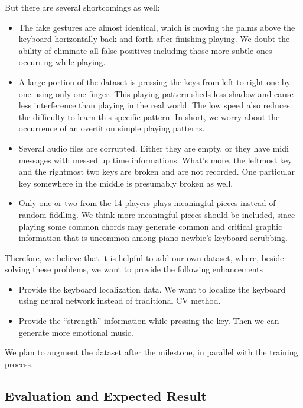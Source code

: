 \documentclass[10pt,twocolumn,letterpaper]{article}
\begin{document}
    But there are several shortcomings as well:
    \begin{itemize}
        \item The fake gestures are almost identical, which is moving the palms above the keyboard horizontally back and forth after finishing playing. We doubt the ability of eliminate all false positives including those more subtle ones occurring while playing.
        \item A large portion of the dataset is pressing the keys from left to right one by one using only one finger. This playing pattern sheds less shadow and cause less interference than playing in the real world. The low speed also reduces the difficulty to learn this specific pattern. In short, we worry about the occurrence of an overfit on simple playing patterns.
        \item Several audio files are corrupted. Either they are empty, or they have midi messages with messed up time informations. What’s more, the leftmost key and the rightmost two keys are broken and are not recorded. One particular key somewhere in the middle is presumably broken as well.
        \item Only one or two from the 14 players plays meaningful pieces instead of random fiddling. We think more meaningful pieces should be included, since playing some common chords may generate common and critical graphic information that is uncommon among piano newbie’s keyboard-scrubbing.
    \end{itemize}

    Therefore, we believe that it is helpful to add our own dataset, where, beside solving these problems, we want to provide the following enhancements
    \begin{itemize}
        \item Provide the keyboard localization data. We want to localize the keyboard using neural network instead of traditional CV method.
        \item Provide the “strength” information while pressing the key. Then we can generate more emotional music.
    \end{itemize}

    We plan to augment the dataset after the milestone, in parallel with the training process.

    \subsection{Evaluation and Expected Result}
\end{document}
